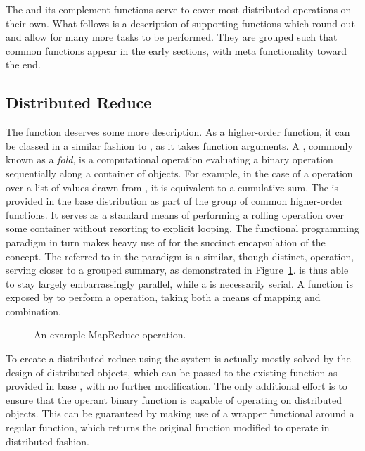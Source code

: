 The  and its complement  functions serve to cover most distributed operations on their own.
What follows is a description of supporting functions which round out and allow for many more tasks to be performed.
They are grouped such that common functions appear in the early sections, with meta functionality toward the end.

\subsection{Distributed Reduce}

The  function deserves some more description.
As a higher-order function, it can be classed in a similar fashion to , as it takes function arguments.
A , commonly known as a \textit{fold}, is a computational operation evaluating a binary operation sequentially along a container of objects\cite{bird2010pearls}.
For example, in the case of a \code{+} operation over a list of values drawn from \tbb, it is equivalent to a cumulative sum.
The  is provided in the base  distribution as part of the  group of common higher-order functions.
It serves as a standard means of performing a rolling operation over some container without resorting to explicit looping.
The functional programming paradigm in turn makes heavy use of  for the succinct encapsulation of the concept.
The  referred to in the  paradigm is a similar, though distinct, operation, serving closer to a grouped summary\cite{dean2004mapreduce}, as demonstrated in Figure~\ref{fig:mapreduce}.
 is thus able to stay largely embarrassingly parallel, while a  is necessarily serial.
A  function is exposed by \lsr to perform a  operation, taking both a means of mapping and combination.

\begin{figure}[H]
\begin{center}

\caption{An example MapReduce operation.}
\label{fig:mapreduce}
\end{center}
\end{figure}

To create a distributed reduce using the \lsr{} system is actually mostly solved by the design of distributed objects, which can be passed to the existing  function as provided in base \R{}, with no further modification.
The only additional effort is to ensure that the operant binary function is capable of operating on distributed objects.
This can be guaranteed by making use of a  wrapper functional around a regular function, which returns the original function modified to operate in distributed fashion. 

